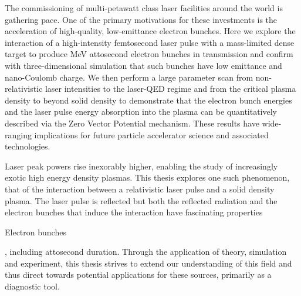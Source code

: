 
The commissioning of multi-petawatt class laser facilities around the world is gathering pace. One of the primary motivations for these investments is the acceleration of high-quality, low-emittance electron bunches. Here we explore the interaction of a high-intensity femtosecond laser pulse with a mass-limited dense target to produce MeV attosecond electron bunches in transmission and confirm with three-dimensional simulation that such bunches have low emittance and nano-Coulomb charge. We then perform a large parameter scan from non-relativistic laser intensities to the laser-QED regime and from the critical plasma density to beyond solid density to demonstrate that the electron bunch energies and the laser pulse energy absorption into the plasma can be quantitatively described via the Zero Vector Potential mechanism. These results have wide-ranging implications for future particle accelerator science and associated technologies.

Laser peak powers rise inexorably higher, enabling the study of increasingly exotic high energy density plasmas. This thesis explores one such phenomenon, that of the interaction between a relativistic laser pulse and a solid density plasma. The laser pulse is reflected but both the reflected radiation and the electron bunches that induce the interaction have fascinating properties

Electron bunches 


, including attosecond duration. Through the application of theory, simulation and experiment, this thesis strives to extend our understanding of this field and thus direct towards potential applications for these sources, primarily as a diagnostic tool. 

